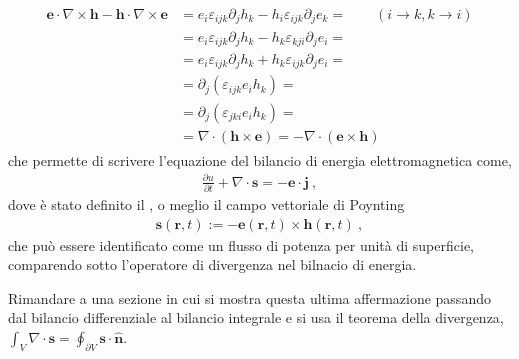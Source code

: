 \documentclass[letterpaper,10pt,english]{jupyterBook}
\begin{document}
\begin{equation*}
\begin{split}\begin{aligned}
\mathbf{e} \cdot \nabla \times \mathbf{h} - \mathbf{h} \cdot \nabla \times \mathbf{e} & = e_i \varepsilon_{ijk} \partial_j h_k - h_i \varepsilon_{ijk} \partial_j e_k = \qquad (i \rightarrow k, k \rightarrow i)\\
& = e_i \varepsilon_{ijk} \partial_j h_k - h_k \varepsilon_{kji} \partial_j e_i = \\
& = e_i \varepsilon_{ijk} \partial_j h_k + h_k \varepsilon_{ijk} \partial_j e_i = \\
& =  \partial_j (\varepsilon_{ijk} e_i  h_k ) = \\
& =  \partial_j (\varepsilon_{jki} e_i  h_k ) = \\
& = \nabla \cdot (\mathbf{h} \times \mathbf{e}) = - \nabla \cdot (\mathbf{e} \times \mathbf{h})
\end{aligned}\end{split}
\end{equation*}
\sphinxAtStartPar
che permette di scrivere l’equazione del bilancio di energia elettromagnetica come,
\begin{equation*}
\begin{split}\frac{\partial u }{\partial t} + \nabla \cdot \mathbf{s} = - \mathbf{e} \cdot \mathbf{j} \ ,\end{split}
\end{equation*}
\sphinxAtStartPar
dove è stato definito il , o meglio il campo vettoriale di Poynting
\begin{equation*}
\begin{split}\mathbf{s}(\mathbf{r},t) := - \mathbf{e}(\mathbf{r},t) \times \mathbf{h}(\mathbf{r},t) \ ,\end{split}
\end{equation*}
\sphinxAtStartPar
che può essere identificato come un flusso di potenza per unità di superficie, comparendo sotto l’operatore di divergenza nel bilnacio di energia.

\sphinxAtStartPar
{} Rimandare a una sezione in cui si mostra questa ultima affermazione passando dal bilancio differenziale al bilancio integrale e si usa il teorema della divergenza, \(\int_V \nabla \cdot \mathbf{s} = \oint_{\partial V} \mathbf{s} \cdot \hat{\mathbf{n}}\).

\sphinxstepscope
\end{document}
